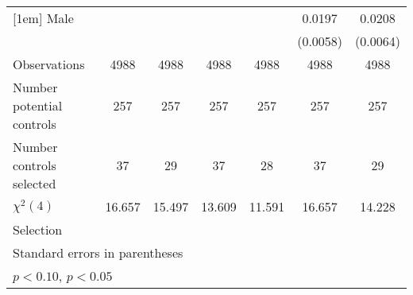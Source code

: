 {\begin{tabular}{l*{6}{c}}
[1em]
\hspace{3mm}Male    &                    &                    &                    &                    &      0.0197\sym{**}&      0.0208\sym{**}\\
                    &                    &                    &                    &                    &    (0.0058)        &    (0.0064)        \\
\hline
Observations        &        4988        &        4988        &        4988        &        4988        &        4988        &        4988        \\
Number potential controls&         257        &         257        &         257        &         257        &         257        &         257        \\
Number controls selected&          37        &          29        &          37        &          28        &          37        &          29        \\
$\chi^2(4)$         &      16.657        &      15.497        &      13.609        &      11.591        &      16.657        &      14.228        \\
Selection           &                    &                    &                    &                    &                    &                    \\
\hline\hline
\multicolumn{7}{l}{\footnotesize Standard errors in parentheses}\\
\multicolumn{7}{l}{\footnotesize \sym{*} \(p<0.10\), \sym{**} \(p<0.05\)}\\
\end{tabular}
}
